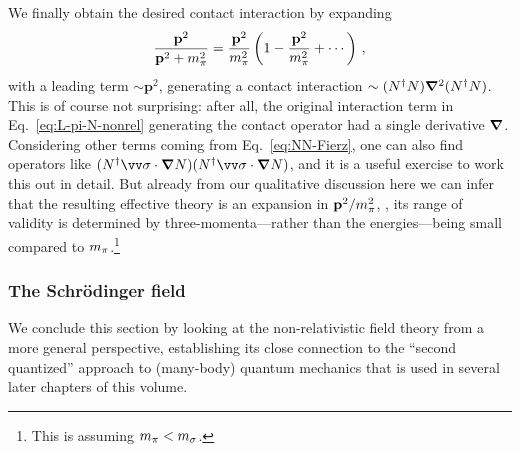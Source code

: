 %
We finally obtain the desired contact interaction by expanding
%
\begin{equation}
 \frac{{\mathbf{p}}^2}{\strut{\mathbf{p}}^2+m_\pi^2}
 = \frac{{\mathbf{p}}^2}{m_\pi^2} \left(1 - \frac{{\mathbf{p}}^2}{m_\pi^2} + \cdots\right) \,,
\end{equation}
%
with a leading term $\sim{\mathbf{p}}^2$, generating a contact interaction $\sim 
(N^\dagger N)\boldsymbol{\nabla}^2(N^\dagger N)$.  This is of course not surprising: after 
all, the original interaction term in Eq.~\eqref{eq:L-pi-N-nonrel} generating 
the contact operator had a single derivative $\boldsymbol{\nabla}$.  Considering other 
terms coming from Eq.~\eqref{eq:NN-Fierz}, one can also find operators like 
$(N^\dagger \skvec{\sigma}\cdot\vNabla N)(N^\dagger \skvec{\sigma}\cdot\vNabla 
N)$, and it is a useful exercise to work this out in detail.  But already from 
our qualitative discussion here we can infer that the resulting effective 
theory is an expansion in ${\mathbf{p}}^2/m_\pi^2$, \ie, its range of validity is 
determined by three-momenta---rather than the energies---being small 
compared to $m_\pi$.\footnote{This is assuming $m_\pi<m_\sigma$.}

\subsubsection{The Schr\"odinger field}

We conclude this section by looking at the non-relativistic field theory from
a more general perspective, establishing its close connection to the ``second
quantized'' approach to (many-body) quantum mechanics that is used 
in several later chapters of this volume.

